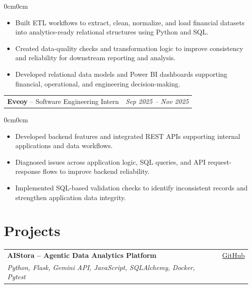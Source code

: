 \documentclass[10pt, letterpaper]{article}
\newenvironment{highlights}{
    \begin{itemize}[
        topsep=0.04cm,
        parsep=0.02cm,
        partopsep=0pt,
        itemsep=0.03cm,
        leftmargin=12pt
    ]
}{
    \end{itemize}
}
\newenvironment{onecolentry}{
    \begin{adjustwidth}{0cm}{0cm}
}{
    \end{adjustwidth}
}
\begin{document}
\begin{onecolentry}
\begin{highlights}
    \item Built ETL workflows to extract, clean, normalize, and load financial
    datasets into analytics-ready relational structures using Python and SQL.
    \item Created data-quality checks and transformation logic to improve
    consistency and reliability for downstream reporting and analysis.
    \item Developed relational data models and Power BI dashboards supporting
    financial, operational, and engineering decision-making.
\end{highlights}
\end{onecolentry}

\vspace{0.10cm}

\begin{tabularx}{\textwidth}{Xr}
    \textbf{Eveoy} -- Software Engineering Intern
        & \textit{Sep 2025 -- Nov 2025}
\end{tabularx}

\begin{onecolentry}
\begin{highlights}
    \item Developed backend features and integrated REST APIs supporting
    internal applications and data workflows.
    \item Diagnosed issues across application logic, SQL queries, and API
    request-response flows to improve backend reliability.
    \item Implemented SQL-based validation checks to identify inconsistent
    records and strengthen application data integrity.
\end{highlights}
\end{onecolentry}


\section{Projects}

\begin{tabularx}{\textwidth}{Xr}
    \textbf{AIStora -- Agentic Data Analytics Platform}
        & \href{https://github.com/JamieWei213213/AiStora}{GitHub}\\
    \textit{Python, Flask, Gemini API, JavaScript, SQLAlchemy, Docker, Pytest}
        & \\
\end{tabularx}
\end{document}
